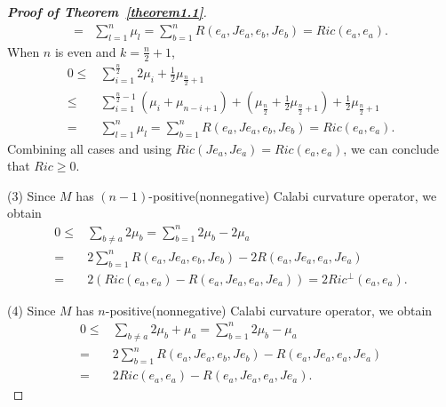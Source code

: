 \documentclass[10pt,a4paper]{amsart}
\begin{document}
\begin{proof}[{\bf Proof of Theorem~\ref{theorem1.1}}]
\begin{align*}
 = & \sum\limits_{l = 1}^n {{\mu _l}}  = \sum\limits_{b = 1}^n {R\left( {{e_a},J{e_a},{e_b},J{e_b}} \right)}
 =  Ric\left( {{e_a},{e_a}} \right).
\end{align*}
When $n$ is even and $k = \frac{n}{2}+1$,
\begin{align*}
0 \le & \sum\limits_{i = 1}^{\frac{n}{2}} {2{\mu _i}}  + \frac{1}{2}{\mu _{\frac{n}{2} + 1}}\\
 \le & \sum\limits_{i = 1}^{\frac{n}{2} - 1} {\left( {{\mu _i} + {\mu _{n - i + 1}}} \right)}  + \left( {{\mu _{\frac{n}{2}}} + \frac{1}{2}{\mu _{\frac{n}{2} + 1}}} \right) + \frac{1}{2}{\mu _{\frac{n}{2} + 1}}\\
 = & \sum\limits_{l = 1}^n {{\mu _l}}  = \sum\limits_{b = 1}^n {R\left( {{e_a},J{e_a},{e_b},J{e_b}} \right)}
 =  Ric\left( {{e_a},{e_a}} \right).
\end{align*}
Combining all cases and using   $Ric\left( {J{e_a},J{e_a}} \right) = Ric\left( {{e_a},{e_a}} \right)$, we can conclude that $Ric \ge 0$.

(3) Since $M$ has $\left( n-1 \right)$-positive(nonnegative) Calabi curvature operator, we obtain
\begin{align*}
0 \le & \sum\limits_{b \ne a}^{} {2{\mu _b}}
 = \sum\limits_{b = 1}^n {2{\mu _b}}  - 2{\mu _a}\\
 =& 2\sum\limits_{b = 1}^n {R\left( {{e_a},J{e_a},{e_b},J{e_b}} \right)}  - 2R\left( {{e_a},J{e_a},{e_a},J{e_a}} \right)\\
 =& 2\left( {Ric\left( {{e_a},{e_a}} \right) - R\left( {{e_a},J{e_a},{e_a},J{e_a}} \right)} \right)
 = 2Ri{c^ \bot }\left( {{e_a},{e_a}} \right) .
\end{align*}

(4) Since $M$ has $ n $-positive(nonnegative) Calabi curvature operator, we obtain
\begin{align*}
0 \le & \sum\limits_{b \ne a}^{} {2{\mu _b}}  + {\mu _a}
 =  \sum\limits_{b = 1}^n {2{\mu _b}}  - {\mu _a}\\
 = & 2\sum\limits_{b = 1}^n {R\left( {{e_a},J{e_a},{e_b},J{e_b}} \right)}  - R\left( {{e_a},J{e_a},{e_a},J{e_a}} \right)\\
 = & 2Ric\left( {{e_a},{e_a}} \right) - R\left( {{e_a},J{e_a},{e_a},J{e_a}} \right).
\end{align*}



\end{proof}
\end{document}
